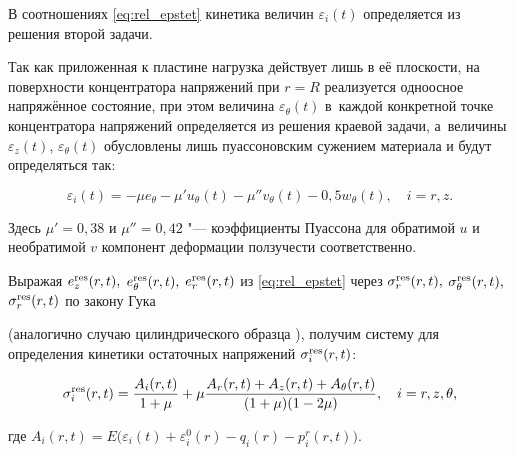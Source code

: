 %

%

%



В соотношениях \eqref{eq:rel_epstet} кинетика величин $\varepsilon_i(t)$ определяется из решения второй задачи.

Так как приложенная к пластине нагрузка действует лишь в её плоскости,  на  поверхности концентратора напряжений при $r=R$ реализуется одноосное напряж\"енное состояние, при этом величина $\varepsilon_\theta(t)$ в~каждой конкретной точке концентратора напряжений определяется из решения краевой задачи, а~величины $\varepsilon_z(t)$, $\varepsilon_{\theta}(t)$ обусловлены лишь пуассоновским сужением материала и будут определяться так:

$$

 \varepsilon_i(t)=-\mu e_\theta-\mu'u_\theta(t)-\mu''v_\theta(t)- 0,5 w_\theta (t), \quad i={r, z}.

$$

Здесь $\mu'=0,38$ и $\mu''=0,42$ "--- коэффициенты Пуассона для обратимой $u$  и необратимой $v$ компонент деформации ползучести соответственно.





Выражая $e_z^{\rm res}(r, t),$ $e_\theta^{\rm res}(r, t),$ $e_r^{\rm res}(r, t)$ из \eqref{eq:rel_epstet} через $\sigma^{\rm res}_r(r, t),$ $\sigma^{\rm res}_\theta(r, t),$ $\sigma^{\rm res}_r(r, t)$ по закону Гука

(аналогично  случаю цилиндрического образца \cite{SauDub10}), получим систему  для определения кинетики остаточных напряжений $\sigma^{\rm res}_i(r, t)$:

\begin{equation}

\label{eq:r112} 

\sigma_i^{\rm res}(r,t)=\frac{A_i(r,t)}{1+\mu} +\mu \frac{A_r(r,t)+A_z(r,t)+A_\theta(r,t)}{(1+\mu)(1-2\mu)}, 

\quad i={r,z,\theta},

\end{equation}

где $A_i(r,t)=E\bigl(\varepsilon_i(t)+\varepsilon_i^0(r)-q_i(r)-p_i^{r}(r,t)\bigr).$









